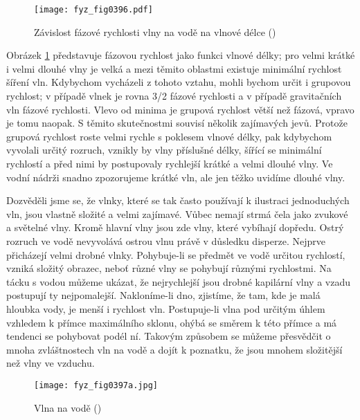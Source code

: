   \begin{figure}[ht!] %
    \centering
    \texttt{[image: fyz\_fig0396.pdf]}
    \caption{Závislost fázové rychlosti vlny na vodě na vlnové délce
             (\cite[s.~697]{Feynman01})}
    \label{fyz:fig0396}
  \end{figure}
  Obrázek \ref{fyz:fig0396} představuje fázovou rychlost jako funkci vlnové délky; pro velmi krátké 
  i velmi dlouhé vlny je velká a mezi těmito oblastmi existuje minimální rychlost šíření vln. 
  Kdybychom vycházeli z tohoto vztahu, mohli bychom určit i grupovou rychlost; v případě vlnek je 
  rovna \num{3/2} fázové rychlosti a v případě gravitačních vln  fázové rychlosti. Vlevo 
  od minima je grupová rychlost větší  než fázová, vpravo je tomu naopak. S těmito skutečnostmi 
  souvisí několik zajímavých jevů. Protože grupová rychlost roste velmi rychle s poklesem vlnové 
  délky, pak kdybychom vyvolali určitý rozruch, vznikly by vlny příslušné délky, šířící se 
  minimální rychlostí a před nimi by postupovaly rychlejší krátké a velmi dlouhé vlny. Ve vodní 
  nádrži snadno zpozorujeme krátké vln, ale jen těžko uvidíme dlouhé vlny. 
  
  Dozvěděli jsme se, že vlnky, které se tak často používají k ilustraci jednoduchých vln, jsou 
  vlastně složité a velmi zajímavé. Vůbec nemají strmá čela jako zvukové a světelné vlny. Kromě 
  hlavní vlny jsou zde vlny, které vybíhají dopředu. Ostrý rozruch ve vodě nevyvolává ostrou vlnu 
  právě v důsledku disperze. Nejprve přicházejí velmi drobné vlnky. Pohybuje-li se předmět ve vodě 
  určitou rychlostí, vzniká složitý obrazec, neboť různé vlny se pohybují různými rychlostmi. Na 
  tácku s vodou můžeme ukázat, že nejrychlejší jsou drobné kapilární vlny a vzadu postupují ty 
  nejpomalejší. Nakloníme-li dno, zjistíme, že tam, kde je malá hloubka vody, je menší i rychlost 
  vln. Postupuje-li vlna pod určitým úhlem vzhledem k přímce maximálního sklonu, ohýbá se směrem k 
  této přímce a má tendenci se pohybovat podél ní. Takovým způsobem se můžeme přesvědčit o mnoha 
  zvláštnostech vln na vodě a dojít k poznatku, že jsou mnohem složitější než vlny ve vzduchu. 


  \begin{figure}[ht!] %
    \centering
    \texttt{[image: fyz\_fig0397a.jpg]}
    \caption{Vlna na vodě
             (\cite[s.~697]{Feynman01})}
    \label{fyz:fig0397}
  \end{figure}
  
